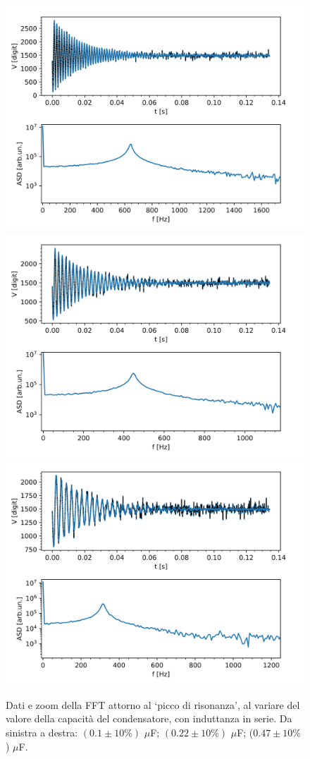 \documentclass{article}[a4paper, oneside,11pt]
\begin{document}
\begin{figure}[H]
    \centering
    \includegraphics[width=0.45\columnwidth]{img/ese12/0.1uF-non_mediati.png}
    \includegraphics[width=0.45\columnwidth]{img/ese12/0.22uF-non_mediati.png}
    \includegraphics[width=0.50\columnwidth]{img/ese12/0.47uF-non_mediati.png}
    \caption{Dati e zoom della FFT attorno al `picco di risonanza', al variare del valore della capacità del condensatore, con induttanza in serie. Da sinistra a destra: $(0.1 \pm 10\%)$ $\mu$F; $(0.22 \pm 10 \%)$ $\mu$F; ($0.47 \pm 10\%$) $\mu$F.}
    \label{fig:ese12 - capacità differenti}
\end{figure}
\end{document}
